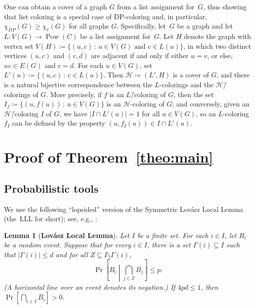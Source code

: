 \documentclass[11pt, reqno, psamsfonts]{amsart}
\newtheorem{lemma}[theo]{Lemma}
\theoremstyle{definition}
\theoremstyle{remark}
\newcommand{\0}{\varnothing}
\newcommand{\set}[1]{\{#1\}}
\renewcommand{\leq}{\leqslant}
\renewcommand{\geq}{\geqslant}
\newcommand{\powerset}[1]{\operatorname{Pow}(#1)}
\newcommand{\defeq}{\coloneqq}
\newcommand{\Cov}[1]{\mathscr{#1}}
\numberwithin{equation}{section}
\newcommand{\bemph}[1]{{\upshape#1}} %
\newcommand{\ep}[1]{\bemph{(}#1\bemph{)}} %
\begin{document}
	One can obtain a cover of a graph $G$ from a list assignment for~$G$, thus showing that list coloring is a special case of DP-coloring and, in particular, $\chi_{DP}(G) \geq \chi_\ell(G)$ for all graphs $G$. Specifically, let~$G$ be a graph and let $L \colon V(G) \to \powerset{C}$ be a list assignment for~$G$. Let $H$ denote the graph with vertex set
	$
	V(H) \defeq \set{(u, c)\,:\, u \in V(G) \text{ and } c \in L(u)}
	$,
	in which two distinct vertices $(u, c)$ and $(v, d)$ are adjacent if and only if either $u = v$, or else, $uv \in E(G)$ and $c=d$.
	For each $u \in V(G)$, set
	$
	L'(u) \defeq \set{(u, c) \,:\, c \in L(u)}
	$.
	Then $\Cov{H} \defeq (L', H)$ is a cover of $G$, and there is a natural bijective correspondence between the $L$-colorings and the $\Cov{H}$\=/colorings of $G$. More precisely, if $f$ is an $L$\=/coloring of $G$, then the set
	$
	I_f \defeq \set{(u, f(u)) \,:\, u \in V(G)}
	$
	is an $\Cov{H}$-coloring of $G$; and conversely, given an $\Cov{H}$\=/coloring $I$ of $G$, we have $|I \cap L'(u)| = 1$ for all $u \in V(G)$, so an $L$-coloring $f_I$ can be defined by the property
	$
		(u, f_I(u)) \in I \cap L'(u)
	$.
	
	\section{Proof of Theorem~\ref{theo:main}}\label{sec:proof}
	
	\subsection{Probabilistic tools}
	
	We use the following ``lopsided'' version of the Symmetric Lov\'{a}sz Local Lemma (the~LLL for short); see, e.g., \cite[p.~65]{AS00}:
	
	\begin{lemma}[{\textbf{Lov\'asz Local Lemma}}]\label{lemma:LLL}
		Let $I$ be a finite set. For each $i \in I$, let $B_i$ be a random event. Suppose that for every $i \in I$, there is a set $\Gamma(i) \subseteq I$ such that $|\Gamma(i)| \leq d$ and for all $Z \subseteq I \setminus \Gamma(i)$,
		\[
			\Pr\left[B_i \middle\vert \bigcap_{j \in Z} \overline{B_j}\right] \leq p.
		\] 
		\ep{A horizontal line over an event denotes its negation.} If $4pd \leq 1$, then $\Pr\left[\bigcap_{i \in I} \overline{B_i}\right] > 0$.
	\end{lemma}
	
\end{document}
